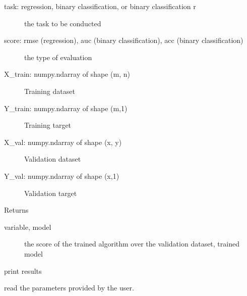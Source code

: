 \documentclass[letterpaper,10pt,english]{sphinxmanual}
\begin{document}
\begin{fulllineitems}
\begin{fulllineitems}
\begin{description}
\item[{task: regression, binary classification, or binary classification r}] \leavevmode
the task to be conducted

\item[{score: rmse (regression), auc (binary classification), acc (binary classification)}] \leavevmode
the type of evaluation

\item[{X\_train: numpy.ndarray of shape (m, n)}] \leavevmode
Training dataset

\item[{Y\_train: numpy.ndarray of shape (m,1)}] \leavevmode
Training target

\item[{X\_val: numpy.ndarray of shape (x, y)}] \leavevmode
Validation dataset

\item[{Y\_val: numpy.ndarray of shape (x,1)}] \leavevmode
Validation target

\end{description}

Returns
\begin{description}
\item[{variable, model}] \leavevmode
the score of the trained algorithm over the validation dataset, trained model

\end{description}

\end{fulllineitems}


\begin{fulllineitems}
\label{\detokenize{index:pspso.pspso.printresults}}
print results

\end{fulllineitems}


\begin{fulllineitems}
\label{\detokenize{index:pspso.pspso.readparameters}}
read the parameters provided by the user.


\end{fulllineitems}
\end{fulllineitems}
\end{document}
